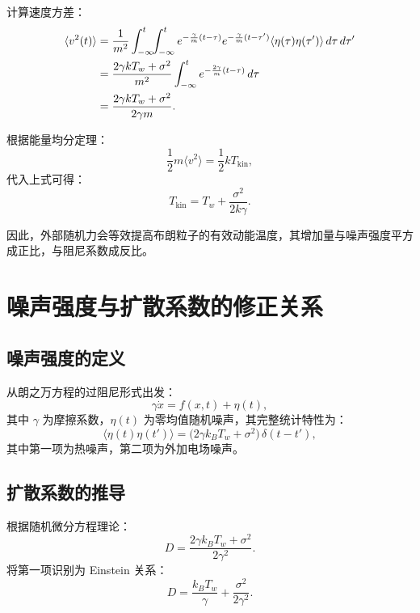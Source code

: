 \documentclass[a4paper,draft]{report} %
\begin{document}
计算速度方差：
\begin{align}
\langle v^2(t) \rangle &= \frac{1}{m^2} \int_{-\infty}^{t} \!\! \int_{-\infty}^{t} 
e^{-\frac{\gamma}{m}(t-\tau)} e^{-\frac{\gamma}{m}(t-\tau')} 
\langle \eta(\tau) \eta(\tau') \rangle \, d\tau \, d\tau' \notag \\
&= \frac{2\gamma k T_w + \sigma^2}{m^2} \int_{-\infty}^{t} e^{-\frac{2\gamma}{m}(t-\tau)} \, d\tau \notag \\
&= \frac{2\gamma k T_w + \sigma^2}{2\gamma m}.
\end{align}

根据能量均分定理：
\begin{equation}
\frac{1}{2} m \langle v^2 \rangle = \frac{1}{2} k T_{\text{kin}},
\end{equation}
代入上式可得：
\begin{equation}
T_{\text{kin}} = T_w + \frac{\sigma^2}{2k\gamma}.
\end{equation}

因此，外部随机力会等效提高布朗粒子的有效动能温度，其增加量与噪声强度平方成正比，与阻尼系数成反比。

\section{噪声强度与扩散系数的修正关系}

\subsection{噪声强度的定义}
从朗之万方程的过阻尼形式出发：
\begin{equation}
\gamma \dot{x} = f(x,t) + \eta(t),
\end{equation}
其中 $\gamma$ 为摩擦系数，$\eta(t)$ 为零均值随机噪声，其完整统计特性为：
\begin{equation}
\langle \eta(t)\eta(t') \rangle = \big( 2\gamma k_B T_w + \sigma^2 \big) \, \delta(t-t'),
\end{equation}
其中第一项为热噪声，第二项为外加电场噪声。

\subsection{扩散系数的推导}
根据随机微分方程理论：
\begin{equation}
D = \frac{2\gamma k_B T_w + \sigma^2}{2\gamma^2}.
\end{equation}
将第一项识别为 Einstein 关系：
\begin{equation}
D = \frac{k_B T_w}{\gamma} + \frac{\sigma^2}{2\gamma^2}.
\end{equation}
\end{document}
